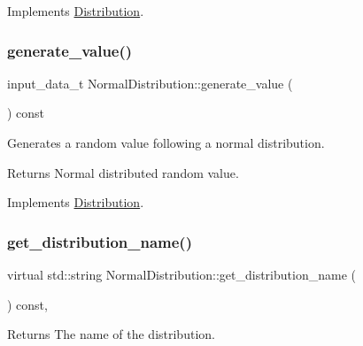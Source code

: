 Implements \hyperlink{classDistribution_a5146d1193531b15a872d401cb97f06ca}{Distribution}.

\mbox{\label{classNormalDistribution_a147f7de64cc0d8eb98a44a4aa1187ec2}} 
\subsubsection{\texorpdfstring{generate\+\_\+value()}{generate\_value()}}
{\footnotesize\ttfamily input\+\_\+data\+\_\+t Normal\+Distribution\+::generate\+\_\+value (\begin{DoxyParamCaption}{ }\end{DoxyParamCaption}) const\hspace{0.3cm}{\ttfamily [virtual]}}

Generates a random value following a normal distribution. \begin{DoxyReturn}{Returns}
Normal distributed random value. 
\end{DoxyReturn}


Implements \hyperlink{classDistribution_a096af8a5e59bd38e0ad7da10632e0c83}{Distribution}.

\mbox{\label{classNormalDistribution_a13afb9f11a9d643ff1af5de2ca066005}} 
\subsubsection{\texorpdfstring{get\+\_\+distribution\+\_\+name()}{get\_distribution\_name()}}
{\footnotesize\ttfamily virtual std\+::string Normal\+Distribution\+::get\+\_\+distribution\+\_\+name (\begin{DoxyParamCaption}{ }\end{DoxyParamCaption}) const\hspace{0.3cm}{\ttfamily [inline]}, {\ttfamily [virtual]}}

\begin{DoxyReturn}{Returns}
The name of the distribution. 
\end{DoxyReturn}


